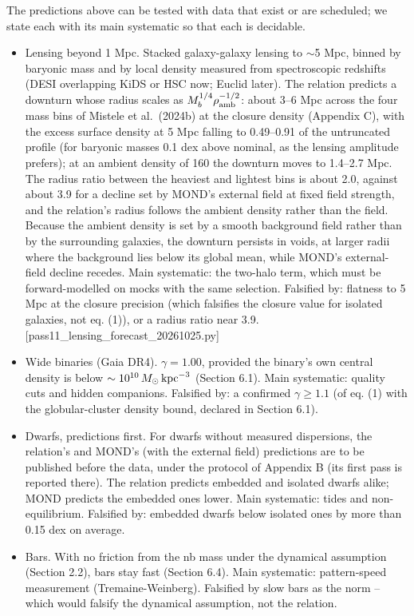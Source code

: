 \documentclass[
  10pt,
]{article}
\begin{document}
The predictions above can be tested with data that exist or are scheduled; we state each with its main systematic so that each is decidable.
\begin{itemize}
\item[(i)] Lensing beyond 1 Mpc. Stacked galaxy-galaxy lensing to $\sim$5 Mpc, binned by baryonic mass and by local density measured from spectroscopic redshifts (DESI overlapping KiDS or HSC now; Euclid later). The relation predicts a downturn whose radius scales as $M_b^{1/4}\rho_{\rm amb}^{-1/2}$: about 3--6 Mpc across the four mass bins of Mistele et al.~(2024b) at the closure density (Appendix C), with the excess surface density at 5 Mpc falling to 0.49--0.91 of the untruncated profile (for baryonic masses 0.1 dex above nominal, as the lensing amplitude prefers); at an ambient density of 160 the downturn moves to 1.4--2.7 Mpc. The radius ratio between the heaviest and lightest bins is about 2.0, against about 3.9 for a decline set by MOND's external field at fixed field strength, and the relation's radius follows the ambient density rather than the field. Because the ambient density is set by a smooth background field rather than by the surrounding galaxies, the downturn persists in voids, at larger radii where the background lies below its global mean, while MOND's external-field decline recedes. Main systematic: the two-halo term, which must be forward-modelled on mocks with the same selection. Falsified by: flatness to 5 Mpc at the closure precision (which falsifies the closure value for isolated galaxies, not eq. (1)), or a radius ratio near 3.9. {[}pass11\_lensing\_forecast\_20261025.py{]}
\item[(ii)] Wide binaries (Gaia DR4). $\gamma=1.00$, provided the binary's own central density is below $\sim10^{10}\,M_\odot\,{\rm kpc}^{-3}$ (Section 6.1). Main systematic: quality cuts and hidden companions. Falsified by: a confirmed $\gamma\ge1.1$ (of eq. (1) with the globular-cluster density bound, declared in Section 6.1).
\item[(iii)] Dwarfs, predictions first. For dwarfs without measured dispersions, the relation's and MOND's (with the external field) predictions are to be published before the data, under the protocol of Appendix B (its first pass is reported there). The relation predicts embedded and isolated dwarfs alike; MOND predicts the embedded ones lower. Main systematic: tides and non-equilibrium. Falsified by: embedded dwarfs below isolated ones by more than 0.15 dex on average.
\item[(iv)] Bars. With no friction from the nb mass under the dynamical assumption (Section 2.2), bars stay fast (Section 6.4). Main systematic: pattern-speed measurement (Tremaine-Weinberg). Falsified by slow bars as the norm -- which would falsify the dynamical assumption, not the relation.
\end{itemize}
\end{document}
